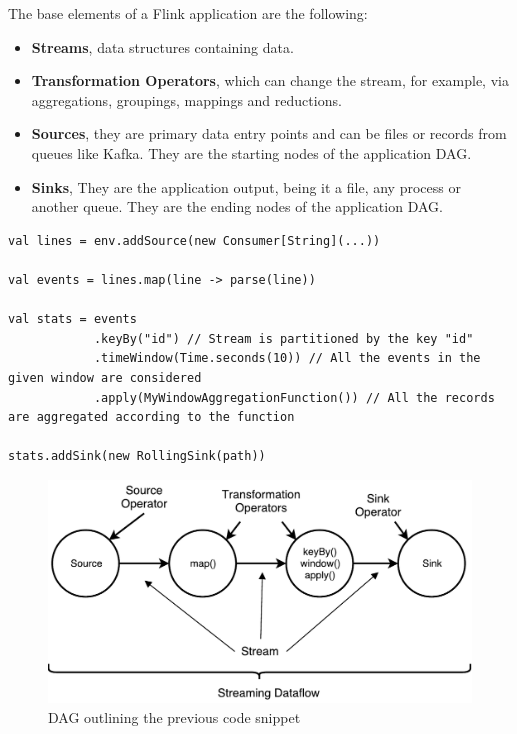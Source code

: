 The base elements of a Flink application are the following:

\begin{itemize}
	\item \textbf{Streams}, data structures containing data.
	\item \textbf{Transformation Operators}, which can change the stream, for example, via aggregations, groupings, mappings and reductions.
	\item \textbf{Sources}, they are primary data entry points and can be files or records from queues like Kafka. They are the starting nodes of the application DAG.
    \item \textbf{Sinks}, They are the application output, being it a file, any process or another queue. They are the ending nodes of the application DAG.
\end{itemize}

\begin{code}

\begin{verbatim}
val lines = env.addSource(new Consumer[String](...))

val events = lines.map(line -> parse(line))

val stats = events
            .keyBy("id") // Stream is partitioned by the key "id" 
            .timeWindow(Time.seconds(10)) // All the events in the given window are considered 
            .apply(MyWindowAggregationFunction()) // All the records are aggregated according to the function      

stats.addSink(new RollingSink(path))
\end{verbatim}

\end{code}

\begin{figure}[h]
	\centering
	\includegraphics[scale=0.75]{Figures/dataflow.pdf}
	\decoRule
	\caption[Streaming Dataflow]{DAG outlining the previous code snippet}
	\label{fig:Dataflow}
\end{figure}


